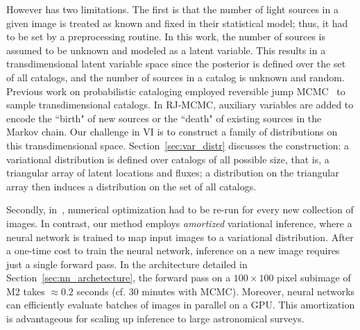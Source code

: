 However \cite{regier2019_celeste} has two limitations. The first is that the number of light sources in a given image is treated as known and fixed in their statistical model; thus, it had to be set by a preprocessing routine. In this work, the number of sources is assumed to be unknown and modeled as a latent variable. 
This results in a transdimensional latent variable space 
since the posterior is defined over the set of all catalogs, and the number of sources in a catalog is unknown and random.
Previous work on probabilistic cataloging employed reversible jump MCMC~\cite{Green95reversiblejump} to sample transdimensional catalogs. In RJ-MCMC, auxiliary variables are added to encode the ``birth" of new sources 
or the ``death" of existing sources in the Markov chain. 
Our challenge in VI is to construct a family of distributions on this transdimensional space.
Section~\ref{sec:var_distr} discusses the construction: 
a variational distribution is defined over catalogs of all possible size, that is, a triangular array of latent locations and fluxes; 
a distribution on the triangular array then induces a distribution on the set of all catalogs.

Secondly, in~\cite{regier2019_celeste}, numerical optimization had to be re-run for every new collection of images. 
In contrast, our method employs {\itshape amortized} variational inference, where a neural network is trained to map input images to a variational distribution.
After a one-time cost to train the neural network, inference 
on a new image requires just a single forward pass.
In the architecture detailed in Section~\ref{sec:nn_archetecture}, the forward pass on 
a $100 \times 100$ pixel subimage of M2 takes $\approx 0.2$ seconds (cf. 30 minutes with MCMC). 
Moreover, neural networks can efficiently evaluate batches of images in parallel on a GPU. 
This amortization is advantageous for scaling up inference to large astronomical surveys.


